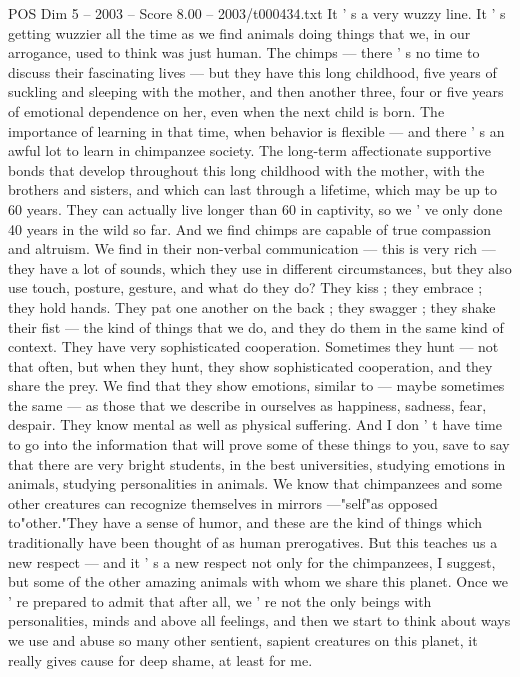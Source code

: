 \begin{textsample}{POS Dim 5 – 2003 – Score 8.00 – 2003/t000434.txt}
It ' s a very wuzzy line.
It ' s getting wuzzier all the time as we find animals doing things that we, in our arrogance, used to think was just human.
The chimps — there ' s no time to discuss their fascinating lives — but they have this long childhood, five years of suckling and sleeping with the mother, and then another three, four or five years of emotional dependence on her, even when the next child is born.
The importance of learning in that time, when behavior is flexible — and there ' s an awful lot to learn in chimpanzee society.
The long-term affectionate supportive bonds that develop throughout this long childhood with the mother, with the brothers and sisters, and which can last through a lifetime, which may be up to 60 years.
They can actually live longer than 60 in captivity, so we ' ve only done 40 years in the wild so far.
And we find chimps are capable of true compassion and altruism.
We find in their non-verbal communication — this is very rich — they have a lot of sounds, which they use in different circumstances, but they also use touch, posture, gesture, and what do they do?
They kiss ; they embrace ; they hold hands.
They pat one another on the back ; they swagger ; they shake their fist — the kind of things that we do, and they do them in the same kind of context.
They have very sophisticated cooperation.
Sometimes they hunt — not that often, but when they hunt, they show sophisticated cooperation, and they share the prey.
We find that they show emotions, similar to — maybe sometimes the same — as those that we describe in ourselves as happiness, sadness, fear, despair.
They know mental as well as physical suffering.
And I don ' t have time to go into the information that will prove some of these things to you, save to say that there are very bright students, in the best universities, studying emotions in animals, studying personalities in animals.
We know that chimpanzees and some other creatures can recognize themselves in mirrors —"self"as opposed to"other."They have a sense of humor, and these are the kind of things which traditionally have been thought of as human prerogatives.
But this teaches us a new respect — and it ' s a new respect not only for the chimpanzees, I suggest, but some of the other amazing animals with whom we share this planet.
Once we ' re prepared to admit that after all, we ' re not the only beings with personalities, minds and above all feelings, and then we start to think about ways we use and abuse so many other sentient, sapient creatures on this planet, it really gives cause for deep shame, at least for me.

\end{textsample}
